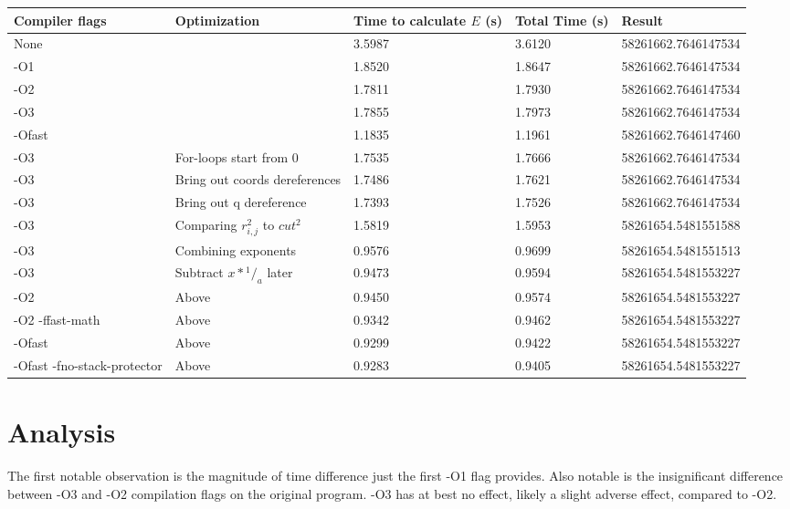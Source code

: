 \documentclass[12pt]{article}
\begin{document}
	\singlespacing
	\begin{center}
	\begin{tabular}{| p{3cm} | p{4cm} | p{1.5cm} | p{1.5cm} | l |}
	\hline
	Compiler flags & Optimization\footnotemark[1] & Time to calculate $E$ (s) & Total Time (s) & Result \\ \hline
	None & & 3.5987 & 3.6120 & 58261662.7646147534 \\ \hline
	-O1 & & 1.8520 & 1.8647 & 58261662.7646147534 \\ \hline
	-O2 & & 1.7811 & 1.7930 & 58261662.7646147534 \\ \hline
	-O3 & & 1.7855 & 1.7973 & 58261662.7646147534 \\ \hline
	-Ofast & & 1.1835 & 1.1961 & 58261662.7646147460 \\ \hline
	-O3 & For-loops start from 0 & 1.7535 & 1.7666 & 58261662.7646147534 \\ \hline
	-O3 & Bring out coords dereferences & 1.7486 & 1.7621 & 58261662.7646147534 \\ \hline
	-O3 & Bring out q dereference & 1.7393 & 1.7526 & 58261662.7646147534 \\ \hline
	-O3 & Comparing $r_{i,j}^2$ to $cut^2$ & 1.5819 & 1.5953 & 58261654.5481551588 \\ \hline
	-O3 & Combining exponents & 0.9576 & 0.9699 & 58261654.5481551513 \\ \hline
	-O3 & Subtract $x*{^1/_a}$ later & 0.9473 & 0.9594 & 58261654.5481553227 \\ \hline
	-O2 & Above & 0.9450 & 0.9574 & 58261654.5481553227 \\ \hline
	-O2 -ffast-math & Above & 0.9342 & 0.9462 & 58261654.5481553227 \\ \hline
	-Ofast & Above & 0.9299 & 0.9422 & 58261654.5481553227 \\ \hline
	-Ofast -fno-stack-protector & Above & 0.9283 & 0.9405 & 58261654.5481553227 \\ \hline
	\end{tabular}
	\end{center}
	\doublespacing

	\section{Analysis}

	The first notable observation is the magnitude of time difference just the first -O1 flag provides. 
	Also notable is the insignificant difference between -O3 and -O2 compilation flags on the original program.
	-O3 has at best no effect, likely a slight adverse effect, compared to -O2. 
\end{document}
